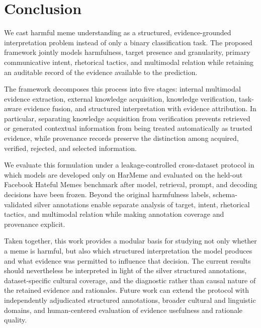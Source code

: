 \section{Conclusion}
\label{sec:conclusion}

We cast harmful meme understanding as a structured,
evidence-grounded interpretation problem instead of only a binary
classification task.
The proposed framework jointly models harmfulness, target presence and
granularity, primary communicative intent, rhetorical tactics, and
multimodal relation while retaining an auditable record of the evidence
available to the prediction.

The framework decomposes this process into five stages:
internal multimodal evidence extraction, external knowledge acquisition,
knowledge verification, task-aware evidence fusion, and structured
interpretation with evidence attribution.
In particular, separating knowledge acquisition from verification prevents
retrieved or generated contextual information from being treated
automatically as trusted evidence, while provenance records preserve the
distinction among acquired, verified, rejected, and selected information.

We evaluate this formulation under a leakage-controlled cross-dataset
protocol in which models are developed only on HarMeme and evaluated on the
held-out Facebook Hateful Memes benchmark after model, retrieval, prompt,
and decoding decisions have been frozen.
Beyond the original harmfulness labels, schema-validated silver
annotations enable separate analysis of target, intent, rhetorical tactics,
and multimodal relation while making annotation coverage and provenance
explicit.

%
%

Taken together, this work provides a modular basis for studying not only
whether a meme is harmful, but also which structured interpretation the
model produces and what evidence was permitted to influence that decision.
The current results should nevertheless be interpreted in light of the
silver structured annotations, dataset-specific cultural coverage, and the
diagnostic rather than causal nature of the retained evidence and
rationales.
Future work can extend the protocol with independently adjudicated
structured annotations, broader cultural and linguistic domains, and
human-centered evaluation of evidence usefulness and rationale quality.
